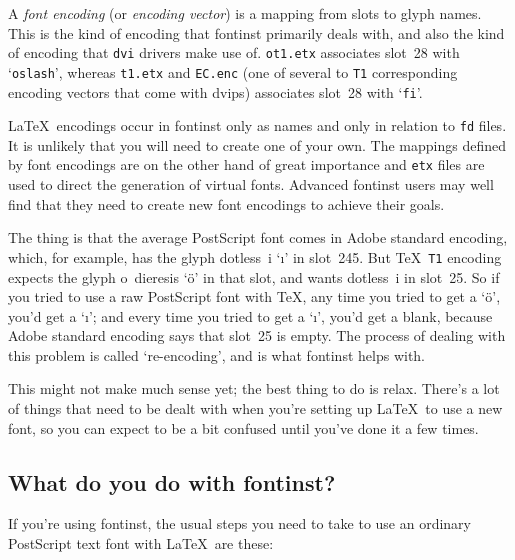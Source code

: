 \documentclass[a4paper]{ltxguide}
\newcommand{\PS}{Post\-Script\xspace}
\newcommand*{\setfilename}[1]{\texttt{#1}}
\newcommand*{\setpackagename}[1]{\textsf{#1}}
\newcommand{\dvips}   {\setpackagename{dvips}\xspace}
\newcommand{\fontinst}{\setpackagename{font\-inst}\xspace}
\newcommand{\fd} {\setfilename{fd}\xspace}
\newcommand{\etx}{\setfilename{etx}\xspace}
\newcommand{\dvi}{\setfilename{dvi}\xspace}
\begin{document}
\begin{description}
  A \emph{font encoding} (or \emph{encoding vector}) is a mapping from 
  slots to glyph names. This is the kind of encoding that \fontinst 
  primarily deals with, and also the kind of encoding that \dvi 
  drivers make use of. \texttt{ot1.etx} associates slot~28 with 
  `\texttt{oslash}', whereas \texttt{t1.etx} and \texttt{EC.enc} (one 
  of several to \texttt{T1} corresponding encoding vectors that come 
  with \dvips) associates slot~28 with `\texttt{fi}'.
  
  \LaTeX\ encodings occur in \fontinst only as names and only in 
  relation to \fd files. It is unlikely that you will need to create 
  one of your own. The mappings defined by font encodings are on the 
  other hand of great importance and \etx files are used to direct 
  the generation of virtual fonts. Advanced \fontinst users may well 
  find that they need to create new font encodings to achieve their 
  goals.
\end{description}


The thing is that the average \PS font comes in Adobe standard
encoding, which, for example, has the glyph dotless~i `\i' in
slot~245.  But \TeX\ \texttt{T1} encoding expects the glyph o~dieresis
`{\"o}' in that slot, and wants dotless~i in slot~25.  So if you
tried to use a raw \PS font with \TeX, any time you tried to get
a `{\"o}', you'd get a `\i'; and every time you tried to get a `\i',
you'd get a blank, because Adobe standard encoding says that
slot~25 is empty.  The process of dealing with this problem is
called `re-encoding', and is what \fontinst helps with.

This might not make much sense yet; the best thing to do is relax.
There's a lot of things that need to be dealt with when you're
setting up \LaTeX\ to use a new font, so you can expect to be a
bit confused until you've done it a few times.


\subsection{What do you do with \fontinst?}

If you're using \fontinst, the usual steps you need to take to use
an ordinary \PS text font with \LaTeX\ are these:
\end{document}
